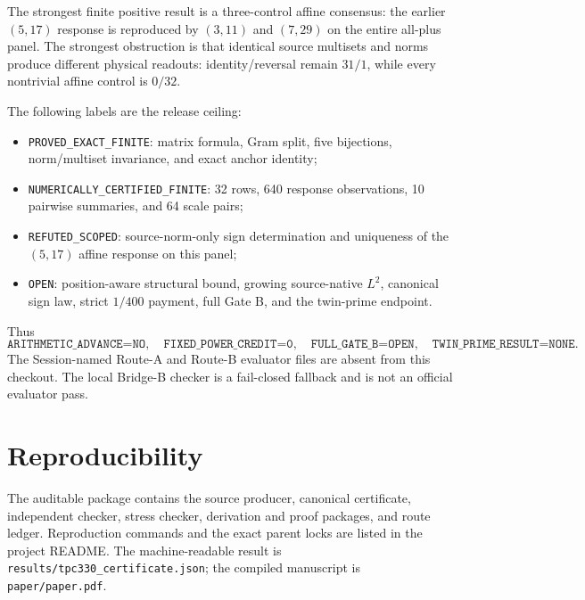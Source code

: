 \documentclass[10pt]{article}
\begin{document}
The strongest finite positive result is a three-control affine consensus:
the earlier $(5,17)$ response is reproduced by $(3,11)$ and $(7,29)$ on the
entire all-plus panel.  The strongest obstruction is that identical source
multisets and norms produce different physical readouts: identity/reversal
remain $31/1$, while every nontrivial affine control is $0/32$.

The following labels are the release ceiling:
\begin{itemize}
  \item \texttt{PROVED\_EXACT\_FINITE}: matrix formula, Gram split, five
        bijections, norm/multiset invariance, and exact anchor identity;
  \item \texttt{NUMERICALLY\_CERTIFIED\_FINITE}: 32 rows, 640 response
        observations, 10 pairwise summaries, and 64 scale pairs;
  \item \texttt{REFUTED\_SCOPED}: source-norm-only sign determination and
        uniqueness of the $(5,17)$ affine response on this panel;
  \item \texttt{OPEN}: position-aware structural bound, growing source-native
        $L^2$, canonical sign law, strict $1/400$ payment, full Gate B, and
        the twin-prime endpoint.
\end{itemize}
Thus
\[
 \texttt{ARITHMETIC\_ADVANCE=NO},\quad
 \texttt{FIXED\_POWER\_CREDIT=0},\quad
 \texttt{FULL\_GATE\_B=OPEN},\quad
 \texttt{TWIN\_PRIME\_RESULT=NONE}.
\]
The Session-named Route-A and Route-B evaluator files are absent from this
checkout.  The local Bridge-B checker is a fail-closed fallback and is not an
official evaluator pass.

\section{Reproducibility}

The auditable package contains the source producer, canonical certificate,
independent checker, stress checker, derivation and proof packages, and route
ledger.  Reproduction commands and the exact parent locks are listed in the
project README.  The machine-readable result is
\texttt{results/tpc330\_certificate.json}; the compiled manuscript is
\texttt{paper/paper.pdf}.



\end{document}

